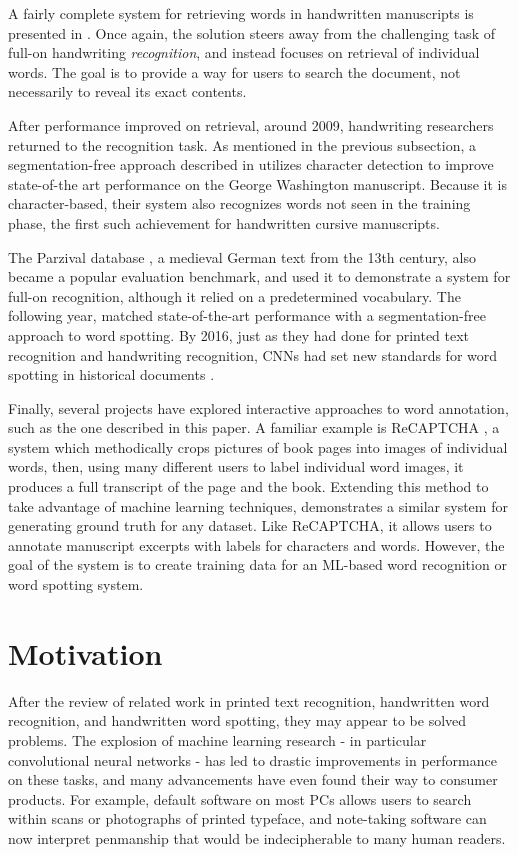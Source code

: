 \documentclass[final]{ukthesis}
\begin{document}
A fairly complete system for retrieving words in handwritten manuscripts is presented in \cite{rath2004search}. Once again, the solution steers away from the challenging task of full-on handwriting {\em recognition}, and instead focuses on retrieval of individual words. The goal is to provide a way for users to search the document, not necessarily to reveal its exact contents.

After performance improved on retrieval, around 2009, handwriting researchers returned to the recognition task. As mentioned in the previous subsection, a segmentation-free approach described in \cite{howe2009finding} utilizes character detection to improve state-of-the art performance on the George Washington manuscript. Because it is character-based, their system also recognizes words not seen in the training phase, the first such achievement for handwritten cursive manuscripts.

The Parzival database \cite{fischer2010ground}, a medieval German text from the 13th century, also became a popular evaluation benchmark, and \cite{fischer2014combined} used it to demonstrate a system for full-on recognition, although it relied on a predetermined vocabulary. The following year, \cite{rusinol2015efficient} matched state-of-the-art performance with a segmentation-free approach to word spotting. By 2016, just as they had done for printed text recognition and handwriting recognition, CNNs had set new standards for word spotting in historical documents \cite{sudholt2016phocnet,zhong2016spottingnet,krishnan2016deep} .

Finally, several projects have explored interactive approaches to word annotation, such as the one described in this paper. A familiar example is ReCAPTCHA \cite{von2008recaptcha}, a system which methodically crops pictures of book pages into images of individual words, then, using many different users to label individual word images, it produces a full transcript of the page and the book. Extending this method to take advantage of machine learning techniques, \cite{biller2013webgt} demonstrates a similar system for generating ground truth for any dataset. Like ReCAPTCHA, it allows users to annotate manuscript excerpts with labels for characters and words. However, the goal of the system is to create training data for an ML-based word recognition or word spotting system.


%
%
\section{Motivation}
After the review of related work in printed text recognition, handwritten word recognition, and handwritten word spotting, they may appear to be solved problems. The explosion of machine learning research - in particular convolutional neural networks - has led to drastic improvements in performance on these tasks, and many advancements have even found their way to consumer products. For example, default software on most PCs allows users to search within scans or photographs of printed typeface, and note-taking software can now interpret penmanship that would be indecipherable to many human readers.
\end{document}
